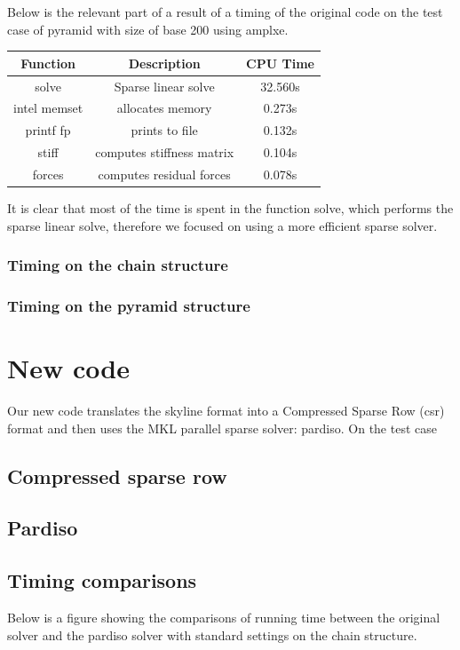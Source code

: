 \documentclass[11pt]{article}
\begin{document}
Below is the relevant part of a result of a timing of the original code on the test case of pyramid with size of base 200 using amplxe.
\begin{center}
 \begin{tabular}{||c c c ||} 
 \hline
 Function & Description & CPU Time \\ [0.5ex] 
 \hline\hline
 solve & Sparse linear solve & 32.560s  \\ 
 \hline
 intel memset  & allocates memory & 0.273s  \\
 \hline
 printf fp & prints to file & 0.132s  \\
 \hline
 stiff & computes stiffness matrix & 0.104s  \\
 \hline
  forces & computes residual forces & 0.078s  \\[1ex] 
 \hline
\end{tabular}
\end{center}

It is clear that most of the time is spent in the function solve, which performs the sparse linear solve, therefore we focused on using a more efficient sparse solver.


\subsubsection{Timing on the chain structure}

\subsubsection{Timing on the pyramid structure}

\section{New code}
Our new code translates the skyline format into a Compressed Sparse Row (csr) format and then uses the MKL parallel sparse solver: pardiso. On the test case 

\subsection{Compressed sparse row}

\subsection{Pardiso}
\subsection{Timing comparisons}
Below is a figure showing  the comparisons of running time between the original solver and the pardiso solver with standard settings on the chain structure. \\
\end{document}
